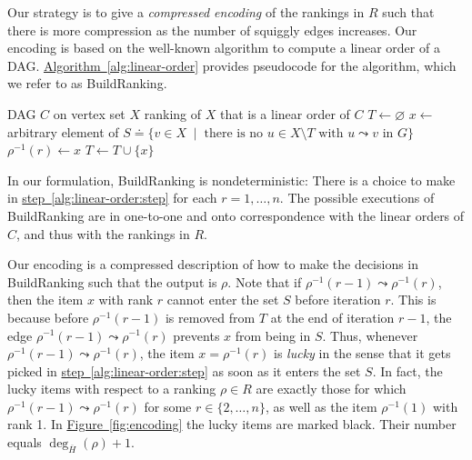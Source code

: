\documentclass[11pt]{article}
\numberwithin{equation}{section}
\theoremstyle{definition}
\theoremstyle{plain}
\newcommand{\expref}[2]{\hyperref[#2]{#1~\ref{#2}}}
\newcommand{\ranking}{\rho}
\begin{document}
Our strategy is to give a \emph{compressed encoding} of the rankings in $R$ such that there is more compression as the number of squiggly edges increases. Our encoding is based on the well-known algorithm to compute a linear order of a DAG. \expref{Algorithm}{alg:linear-order} provides pseudocode for
the algorithm, which we refer to as BuildRanking.

\begin{algorithm}[ht]
  \caption{BuildRanking$(C)$}\label{alg:linear-order}
  \begin{algorithmic}[1]
    \Require DAG $C$ on vertex set $X$
    \Ensure ranking of $X$ that is a linear order of $C$
    \State $T \gets \varnothing$
      \State \label{alg:linear-order:step}%
      $x \gets$ arbitrary element of $S \doteq  \{ v \in X \;\mid\; \text{there is no } u \in X \setminus T \text{ with } u \leadsto v \text{ in } G \}$
      \State $\ranking^{-1}(r) \gets x$ 
      \State $T \gets T \cup \{x\}$
    \EndFor
  \end{algorithmic}
\end{algorithm}

In our formulation, BuildRanking is nondeterministic: There is a choice to make in \expref{step}{alg:linear-order:step} for each $r=1,\dots,n$. The possible executions of BuildRanking are in one-to-one and onto correspondence with the linear orders of $C$, and thus with the rankings in $R$. 

Our encoding is a compressed description of how to make the decisions in BuildRanking such that the output is $\ranking$. Note that if $\ranking^{-1}(r-1) \leadsto \ranking^{-1}(r)$, then the item $x$ with rank $r$ cannot enter the set $S$ before iteration $r$. This is because before $\ranking^{-1}(r-1)$ is removed from $T$ at the end of iteration $r-1$, the edge $\ranking^{-1}(r-1) \leadsto \ranking^{-1}(r)$ prevents $x$ from being in $S$. Thus, whenever $\ranking^{-1}(r-1) \leadsto \ranking^{-1}(r)$, the item $x=\ranking^{-1}(r)$ is \emph{lucky} in the sense that it gets picked in \expref{step}{alg:linear-order:step} as soon as it enters the set $S$. In fact, the lucky items with respect to a ranking $\ranking \in R$ are exactly those for which $\ranking^{-1}(r-1) \leadsto \ranking^{-1}(r)$ for some $r \in \{2,\dots,n\}$, as well as the item $\ranking^{-1}(1)$ with rank 1. In \expref{Figure}{fig:encoding} the lucky items are marked black. Their number equals $\deg_{\overline{H}}(\ranking)+1$. 
\end{document}
